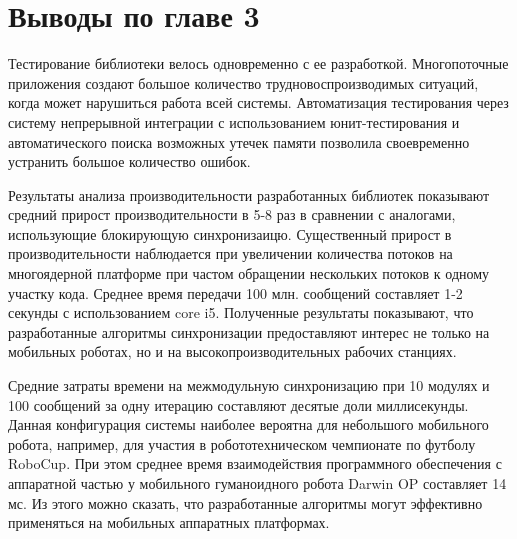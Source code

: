 \section*{Выводы по главе 3}

Тестирование библиотеки велось одновременно с ее разработкой. Многопоточные 
приложения создают большое количество трудновоспроизводимых ситуаций, когда 
может нарушиться работа всей системы. Автоматизация тестирования через систему 
непрерывной интеграции с использованием юнит-тестирования и автоматического 
поиска возможных утечек памяти позволила своевременно устранить большое 
количество ошибок.

Результаты анализа производительности разработанных библиотек показывают 
средний прирост производительности в 5-8 раз в сравнении с аналогами, 
использующие блокирующую синхронизаицю. Существенный прирост в 
производительности наблюдается при увеличении количества потоков на 
многоядерной платформе при частом обращении нескольких потоков к одному участку 
кода. Среднее время передачи 100 млн. сообщений составляет 1-2 секунды с 
использованием core i5. Полученные результаты показывают, что разработанные 
алгоритмы синхронизации предоставляют интерес не только на мобильных роботах, 
но и на высокопроизводительных рабочих станциях.

Средние затраты времени на межмодульную синхронизацию при 10 модулях и 100 
сообщений за одну итерацию составляют десятые доли миллисекунды. Данная 
конфигурация системы наиболее вероятна для небольшого мобильного робота, 
например, для участия в робототехническом чемпионате по футболу RoboCup. При 
этом среднее время взаимодействия программного обеспечения с аппаратной частью 
у мобильного гуманоидного робота Darwin OP составляет 14 мс.  Из этого можно 
сказать, что разработанные алгоритмы могут эффективно применяться на мобильных 
аппаратных платформах.